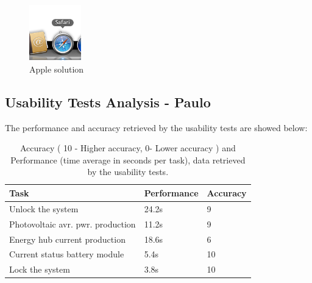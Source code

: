 \begin{figure}[H]
	\center
		\includegraphics[width=0.2\textwidth]{images/legend.png}
   	\caption{Apple solution}
\end{figure}

\subsection{Usability Tests Analysis - Paulo}

The performance and accuracy retrieved by the usability tests are showed below:\\
	
\begin{table}[H]
\begin{tabular}{ | l | l | l |}
	\hline
	Task 					      & 	Performance 	& 	Accuracy 		\\ \hline
	Unlock the system 			      & 	24.2s		& 	9			\\ \hline
	Photovoltaic avr. pwr. production   &		11.2s	    	& 	9			\\ \hline
	Energy hub current production 	      & 	18.6s		&	6 			\\ \hline
	Current status battery module 	      & 	5.4s			& 	10			\\ \hline
	Lock the system 			      & 	3.8s			& 	10			\\ \hline
\end{tabular}
\caption{Accuracy ( 10 - Higher accuracy, 0- Lower accuracy ) and Performance (time average in seconds per task), data retrieved by the usability tests.}
\end{table}

